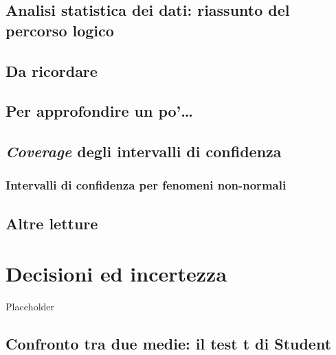 \documentclass[a4paper,12pt,oneside]{book}
\begin{document}
\hypertarget{analisi-statistica-dei-dati-riassunto-del-percorso-logico}{%
\section{Analisi statistica dei dati: riassunto del percorso logico}\label{analisi-statistica-dei-dati-riassunto-del-percorso-logico}}

\hypertarget{da-ricordare}{%
\section{Da ricordare}\label{da-ricordare}}

\hypertarget{per-approfondire-un-po}{%
\section{Per approfondire un po'\ldots{}}\label{per-approfondire-un-po}}

\hypertarget{coverage-degli-intervalli-di-confidenza}{%
\section{\texorpdfstring{\emph{Coverage} degli intervalli di confidenza}{Coverage degli intervalli di confidenza}}\label{coverage-degli-intervalli-di-confidenza}}

\hypertarget{intervalli-di-confidenza-per-fenomeni-non-normali}{%
\subsection{Intervalli di confidenza per fenomeni non-normali}\label{intervalli-di-confidenza-per-fenomeni-non-normali}}

\hypertarget{altre-letture-4}{%
\section{Altre letture}\label{altre-letture-4}}

\hypertarget{decisioni-ed-incertezza}{%
\chapter{Decisioni ed incertezza}\label{decisioni-ed-incertezza}}

Placeholder

\hypertarget{confronto-tra-due-medie-il-test-t-di-student}{%
\section{Confronto tra due medie: il test t di Student}\label{confronto-tra-due-medie-il-test-t-di-student}}
\end{document}
